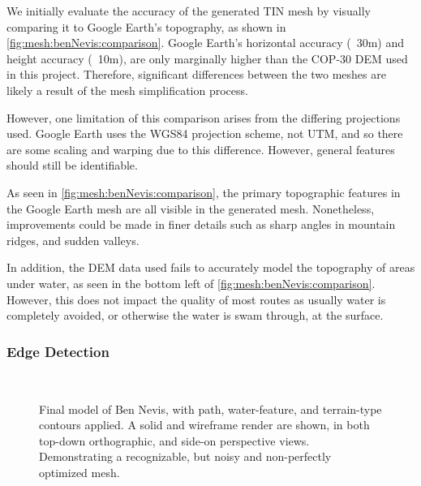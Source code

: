 \documentclass[12pt]{article}
\begin{document}
We initially evaluate the accuracy of the generated TIN mesh by visually comparing it to Google Earth's topography, as shown in \autoref{fig:mesh:benNevis:comparison}. Google Earth's horizontal accuracy (~30m) and height accuracy (~10m), are only marginally higher than the COP-30 DEM used in this project. Therefore, significant differences between the two meshes are likely a result of the mesh simplification process.

However, one limitation of this comparison arises from the differing projections used. Google Earth uses the WGS84 projection scheme, not UTM, and so there are some scaling and warping due to this difference. However, general features should still be identifiable.

As seen in \autoref{fig:mesh:benNevis:comparison}, the primary topographic features in the Google Earth mesh are all visible in the generated mesh. Nonetheless, improvements could be made in finer details such as sharp angles in mountain ridges, and sudden valleys.

In addition, the DEM data used fails to accurately model the topography of areas under water, as seen in the bottom left of \autoref{fig:mesh:benNevis:comparison}. However, this does not impact the quality of most routes as usually water is completely avoided, or otherwise the water is swam through, at the surface.

\subsubsection{Edge Detection}

\begin{figure}[!htbp]
  \centering
  \\
  \caption{Final model of Ben Nevis, with path, water-feature, and terrain-type contours applied. A solid and wireframe render are shown, in both top-down orthographic, and side-on perspective views. Demonstrating a recognizable, but noisy and non-perfectly optimized mesh.}\label{fig:mesh:benNevis}
\end{figure}
\end{document}

